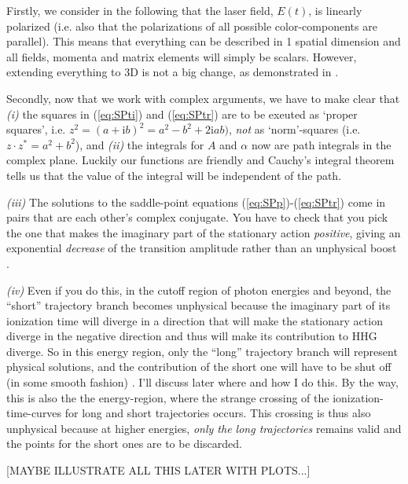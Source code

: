 \documentclass[10pt]{article}
\newcommand{\rmi}{\mathrm i}
\begin{document}
Firstly, we consider in the following that the laser field, $E(t)$, is linearly polarized (i.e. also that the polarizations of all possible color-components are parallel). This means that everything can be described in 1 spatial dimension and all fields, momenta and matrix elements will simply be scalars. However, extending everything to 3D is not a big change, as demonstrated in \cite{Kovacs2010saddlepoint}.

Secondly, now that we work with complex arguments, we have to make clear that \emph{(i)} the squares in (\ref{eq:SPti}) and (\ref{eq:SPtr}) are to be exeuted as `proper squares', i.e. $z^2=(a+\rmi b)^2=a^2 - b^2 + 2\rmi ab)$, \emph{not} as `norm'-squares (i.e. $z\cdot z^*=a^2+b^2$), and \emph{(ii)} the integrals for $A$ and $\alpha$ now are path integrals in the complex plane. Luckily our functions are friendly and Cauchy's integral theorem tells us that the value of the integral will be independent of the path. 

\emph{(iii)} The solutions to the saddle-point equations  (\ref{eq:SPp})-(\ref{eq:SPtr}) come in pairs that are each other's complex conjugate. You have to check that you pick the one that makes the imaginary part of the stationary action \emph{positive}, giving an exponential \emph{decrease} of the transition amplitude rather than an unphysical boost \cite{Lewenstein1995}. 

\emph{(iv)} Even if you do this, in the cutoff region of photon energies and beyond, the ``short'' trajectory branch becomes unphysical because the imaginary part of its ionization time will diverge in a direction that will make the stationary action diverge in the negative direction and thus will make its contribution to HHG diverge. So in this energy region, only the ``long'' trajectory branch will represent physical solutions, and the contribution of the short one will have to be shut off (in some smooth fashion) \cite{Lewenstein1995}. I'll discuss later where and how I do this. By the way, this is also the the energy-region, where the strange crossing of the ionization-time-curves for long and short trajectories occurs. This crossing is thus also unphysical because at higher energies, \emph{only the long trajectories} remains valid and the points for the short ones are to be discarded. 

[MAYBE ILLUSTRATE ALL THIS LATER WITH PLOTS...]
\end{document}
